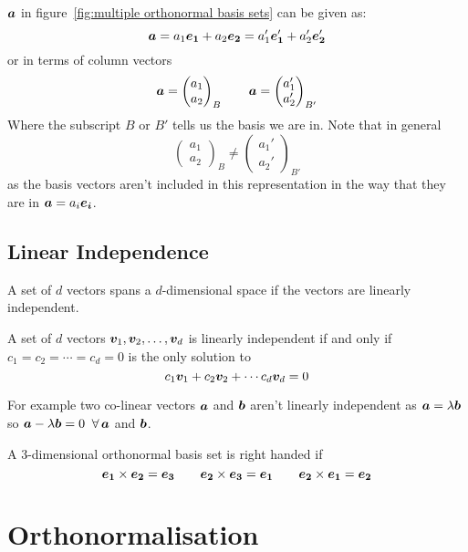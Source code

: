 \documentclass{article}
\begin{document}
    \(\bm{a}\) in figure~\ref{fig:multiple orthonormal basis sets} can be given as:
    \[\bm{a} = a_1\bm{e_{1}} + a_2\bm{e_{2}} = a_1'\bm{e_{1}}' + a_2'\bm{e_{2}}'\]
    or in terms of column vectors
    \[
        \bm{a} = 
        \begin{pmatrix}
            a_1 \\ a_2
        \end{pmatrix}_B
        \qquad
        \bm{a} =
        \begin{pmatrix}
            a_1' \\ a_2'
        \end{pmatrix}_{B'}
    \]
    Where the subscript \(B\) or \(B'\) tells us the basis we are in.
    Note that in general
    \[
        \begin{pmatrix}
        a_1 \\ a_2
        \end{pmatrix}_B
        \ne
        \begin{pmatrix}
        a_1' \\ a_2'
        \end{pmatrix}_{B'}
    \]
    as the basis vectors aren't included in this representation in the way that they are in \(\bm{a} = a_i\bm{e_{i}}\).
    
    \subsection{Linear Independence}
    A set of \(d\) vectors spans a \(d\)-dimensional space if the vectors are linearly independent. 
    
    A set of \(d\) vectors \(\bm{v}_1, \bm{v}_2,\dotsc, \bm{v}_d\) is linearly independent if and only if \(c_1 = c_2 = \dotsb = c_d = 0\) is the only solution to
    \[c_1\bm{v}_1 + c_2\bm{v}_2 + \dotsb c_d\bm{v}_d = 0\]
    
    For example two co-linear vectors \(\bm{a}\) and \(\bm{b}\) aren't linearly independent as \(\bm{a} = \lambda\bm{b}\) so \(\bm{a} - \lambda\bm{b} = 0\) \(\,\forall\,\bm{a}\) and \(\bm{b}\).
    
    A 3-dimensional orthonormal basis set is right handed if
    \[\bm{e_{1}}\times\bm{e_{2}} = \bm{e_{3}} \qquad \bm{e_{2}}\times\bm{e_{3}} = \bm{e_{1}} \qquad \bm{e_{2}}\times\bm{e_{1}} = \bm{e_{2}}\]
    
    \section{Orthonormalisation}
    
\end{document}
